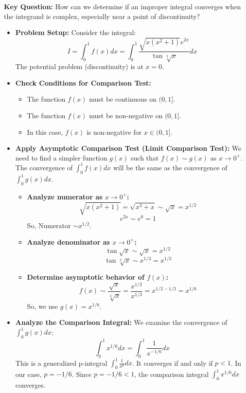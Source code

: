 \hfill

\begin{cascade}
	\textbf{Key Question:} How can we determine if an improper integral converges when the integrand is complex, especially near a point of discontinuity?

	\begin{itemize}
		\item \textbf{Problem Setup:} Consider the integral:
		      $$ I = \int_0^1 f(x) dx = \int_0^1 \frac{\sqrt{x(x^2+1)} e^{2x}}{\tan \sqrt[3]{x}} dx $$
		      The potential problem (discontinuity) is at $x=0$.

		\item \textbf{Check Conditions for Comparison Test:}
		      \begin{itemize}
			      \item The function $f(x)$ must be continuous on $(0, 1]$.
			      \item The function $f(x)$ must be non-negative on $(0, 1]$.
			      \item In this case, $f(x)$ is non-negative for $x \in (0, 1]$.
		      \end{itemize}

		\item \textbf{Apply Asymptotic Comparison Test (Limit Comparison Test):}
		      We need to find a simpler function $g(x)$ such that $f(x) \sim g(x)$ as $x \to 0^+$. The convergence of $\int_0^1 f(x) dx$ will be the same as the convergence of $\int_0^1 g(x) dx$.
		      \begin{itemize}
			      \item \textbf{Analyze numerator as $x \to 0^+$:}
			            $$ \sqrt{x(x^2+1)} = \sqrt{x^3+x} \sim \sqrt{x} = x^{1/2} $$
			            $$ e^{2x} \sim e^0 = 1 $$
			            So, Numerator $\sim x^{1/2}$.
			      \item \textbf{Analyze denominator as $x \to 0^+$:}
			            $$ \tan \sqrt{x} \sim \sqrt{x} = x^{1/2} $$
			            $$ \tan \sqrt[3]{x} \sim x^{1/3} = x^{1/3} $$
			      \item \textbf{Determine asymptotic behavior of $f(x)$:}
			            $$ f(x) \sim \frac{\sqrt{x}}{\sqrt[3]{x}} = \frac{x^{1/2}}{x^{1/3}} = x^{1/2 - 1/3} = x^{1/6} $$
			            So, we use $g(x) = x^{1/6}$.
		      \end{itemize}

		\item \textbf{Analyze the Comparison Integral:}
		      We examine the convergence of $\int_0^1 g(x) dx$:
		      $$ \int_0^1 x^{1/6} dx = \int_0^1 \frac{1}{x^{-1/6}} dx $$
		      This is a generalized p-integral $\int_0^1 \frac{1}{x^p} dx$. It converges if and only if $p < 1$.
		      In our case, $p = -1/6$. Since $p = -1/6 < 1$, the comparison integral $\int_0^1 x^{1/6} dx$ converges.




\end{itemize}
\end{cascade}
